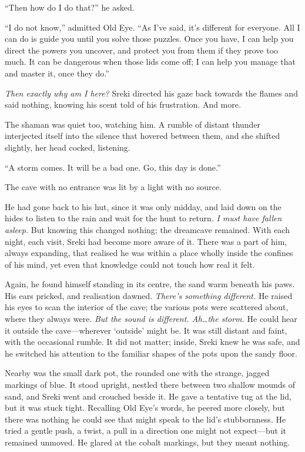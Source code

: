 ``Then how do I do that?'' he asked.

``I do not know,'' admitted Old Eye. ``As I've said, it's different for everyone. All I can do is guide you until you solve those puzzles. Once you have, I can help you direct the powers you uncover, and protect you from them if they prove too much. It can be dangerous when those lids come off; I can help you manage that and master it, once they do.''

\emph{Then exactly why am I here?} Sreki directed his gaze back towards the flames and said nothing, knowing his scent told of his frustration. And more.

The shaman was quiet too, watching him. A rumble of distant thunder interjected itself into the silence that hovered between them, and she shifted slightly, her head cocked, listening.

``A storm comes. It will be a bad one. Go, this day is done.''

\secdiv

\noindent The cave with no entrance was lit by a light with no source.

He had gone back to his hut, since it was only midday, and laid down on the hides to listen to the rain and wait for the hunt to return. \emph{I must have fallen asleep.} But knowing this changed nothing; the dreamcave remained. With each night, each visit, Sreki had become more aware of it. There was a part of him, always expanding, that realised he was within a place wholly inside the confines of his mind, yet even that knowledge could not touch how real it felt.

Again, he found himself standing in its centre, the sand warm beneath his paws. His ears pricked, and realisation dawned. \emph{There's something different.} He raised his eyes to scan the interior of the cave; the various pots were scattered about, where they always were. \emph{But the sound is different. Ah\ldots{}the storm.} He could hear it outside the cave---wherever `outside' might be. It was still distant and faint, with the occasional rumble. It did not matter; inside, Sreki knew he was safe, and he switched his attention to the familiar shapes of the pots upon the sandy floor.

Nearby was the small dark pot, the rounded one with the strange, jagged markings of blue. It stood upright, nestled there between two shallow mounds of sand, and Sreki went and crouched beside it. He gave a tentative tug at the lid, but it was stuck tight. Recalling Old Eye's words, he peered more closely, but there was nothing he could see that might speak to the lid's stubbornness. He tried a gentle push, a twist, a pull in a direction one might not expect---but it remained unmoved. He glared at the cobalt markings, but they meant nothing.

